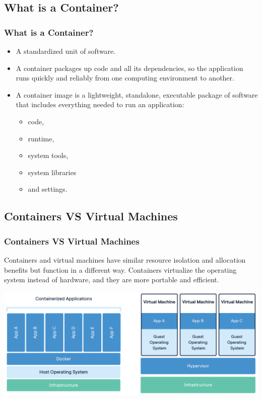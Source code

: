 \documentclass[t,28pt,aspectratio=169,usenames,dvipsnames]{beamer}
\begin{document}
\subsection{What is a Container?}
\begin{frame}
    \frametitle{What is a Container?}
    \begin{itemize}
        \item A standardized unit of software.
        \item A container packages up code and all its dependencies, so the application runs quickly and reliably from one computing environment to another.
        \item A container image is a lightweight, standalone, executable package of software that includes everything needed to run an application: 
        \begin{itemize}
            \item code, 
            \item runtime, 
            \item system tools, 
            \item system libraries 
            \item and settings.
        \end{itemize}
    \end{itemize}
\end{frame}

\subsection{Containers VS Virtual Machines}
\begin{frame}
    \frametitle{Containers VS Virtual Machines}
    Containers and virtual machines have similar resource isolation and allocation benefits but function in a  different way. Containers virtualize the operating system instead of hardware, and they are more portable and efficient.
    \linebreak
    
    \centering
    \includegraphics[scale=0.6]{figures/docker-containerized-and-vm-transparent-bg.png}
\end{frame}
\end{document}
